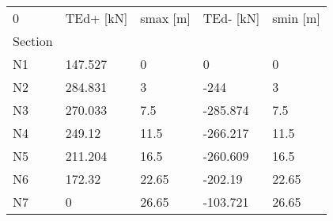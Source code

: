 \begin{tabular}{lllll}
\toprule
0 & TEd+ [kN] & smax [m] & TEd- [kN] & smin [m] \\
Section &           &          &           &          \\
\midrule
N1      &   147.527 &        0 &         0 &        0 \\
N2      &   284.831 &        3 &      -244 &        3 \\
N3      &   270.033 &      7.5 &  -285.874 &      7.5 \\
N4      &    249.12 &     11.5 &  -266.217 &     11.5 \\
N5      &   211.204 &     16.5 &  -260.609 &     16.5 \\
N6      &    172.32 &    22.65 &   -202.19 &    22.65 \\
N7      &         0 &    26.65 &  -103.721 &    26.65 \\
\bottomrule
\end{tabular}
